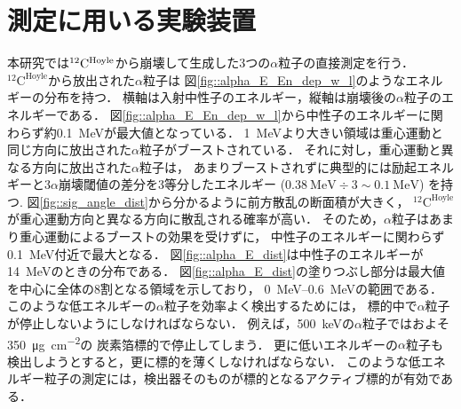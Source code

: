 \documentclass[../master]{subfiles}
\begin{document}
\section{測定に用いる実験装置}
\label{seq::detector_using_experiment}
本研究では${}^{12}{\rm C}^{\text{Hoyle}}$から崩壊して生成した3つの$\alpha$粒子の直接測定を行う．
${}^{12}\mathrm{C}^{\text{Hoyle}}$から放出された$\alpha$粒子は
図\ref{fig::alpha_E_En_dep_w_l}のようなエネルギーの分布を持つ．
横軸は入射中性子のエネルギー，縦軸は崩壊後の$\alpha$粒子のエネルギーである．
図\ref{fig::alpha_E_En_dep_w_l}から中性子のエネルギーに関わらず約\SI{0.1}{\mega\electronvolt}が最大値となっている．
\SI{1}{\mega\electronvolt}より大きい領域は重心運動と同じ方向に放出された$\alpha$粒子がブーストされている．
それに対し，重心運動と異なる方向に放出された$\alpha$粒子は，
あまりブーストされずに典型的には励起エネルギーと3$\alpha$崩壊閾値の差分を3等分したエネルギー
($\SI{0.38}{\mega\electronvolt}\div 3 \sim \SI{0.1}{\mega\electronvolt}$) を持つ.
図\ref{fig::sig_angle_dist}から分かるように前方散乱の断面積が大きく，
${}^{12}\mathrm{C}^{\text{Hoyle}}$が重心運動方向と異なる方向に散乱される確率が高い．
そのため，$\alpha$粒子はあまり重心運動によるブーストの効果を受けずに，
中性子のエネルギーに関わらず\SI{0.1}{\mega\electronvolt}付近で最大となる．
図\ref{fig::alpha_E_dist}は中性子のエネルギーが\SI{14}{\mega\electronvolt}のときの分布である．
図\ref{fig::alpha_E_dist}の塗りつぶし部分は最大値を中心に全体の8割となる領域を示しており，
\SIrange{0}{0.6}{\mega\electronvolt}の範囲である．
このような低エネルギーの$\alpha$粒子を効率よく検出するためには，
標的中で$\alpha$粒子が停止しないようにしなければならない．
例えば，\SI{500}{\kilo\electronvolt}の$\alpha$粒子ではおよそ\SI{350}{\micro\gram\per\square\centi\metre}の
炭素箔標的で停止してしまう．
更に低いエネルギーの$\alpha$粒子も検出しようとすると，更に標的を薄くしなければならない．
このような低エネルギー粒子の測定には，検出器そのものが標的となるアクティブ標的が有効である．
\end{document}
